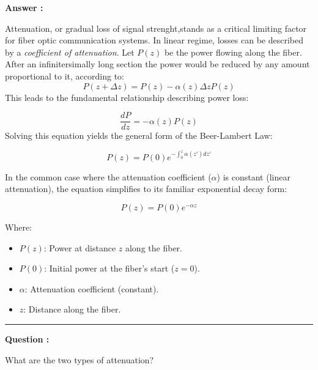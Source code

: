 \documentclass[a4paper,11pt]{book}
\newcounter{qacount}
\newenvironment{question}{
  \refstepcounter{qacount}
  \vspace{1em} %
  \noindent\textbf{Question \theqacount:}\space
}{
  \par %
}
\newenvironment{answer}{
  \noindent\textbf{Answer \theqacount:}\space
}{
  \par\vspace{1em}   %
  \hrule             %
  \vspace{0.5em}     %
}
\begin{document}
\begin{answer}
    Attenuation, or gradual loss of signal strenght,stands as a critical limiting factor for fiber optic communication systems. In linear regime, losses can be described by a \textit{coefficient of attenuation}. Let $P(z)$ be the power flowing along the fiber. After an infinitersimally long section the power would be reduced by any amount proportional to it, according to:
    $$P(z+\Delta z) = P(z) - \alpha(z)\Delta zP(z)$$
    This leads to the fundamental relationship describing power loss:

    $$\frac{dP}{dz}=-\alpha(z)P(z)$$
    Solving this equation yields the general form of the Beer-Lambert Law:

    $$P(z)=P(0) e^{-\int_{0}^{z}\alpha(z')dz'}$$

    In the common case where the attenuation coefficient ($\alpha$) is constant (linear attenuation), the equation simplifies to its familiar exponential decay form:

    $$P(z)=P(0) e^{-\alpha z}$$

    Where:
    \begin{itemize}
        \item $P(z)$: Power at distance $z$ along the fiber.
        \item $P(0)$: Initial power at the fiber's start ($z=0$).
        \item $\alpha$: Attenuation coefficient (constant).
        \item $z$: Distance along the fiber.
    \end{itemize}
\end{answer}

\begin{question}
    What are the two types of attenuation?
\end{question}
\end{document}
